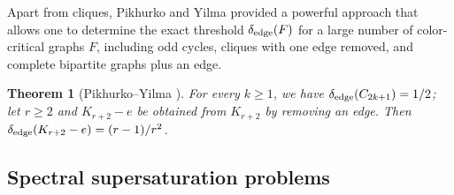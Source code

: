 \documentclass[11pt,a4paper]{article}
\newtheorem{theorem}{Theorem}[section]
\theoremstyle{definition}
\theoremstyle{plain}
\renewcommand{\ge}{\geqslant}
\begin{document}
Apart from cliques, 
Pikhurko and Yilma \cite{PY2017} 
provided a powerful approach that allows one to determine the exact threshold $\delta_{\rm edge}(F)$ for a large number of color-critical
graphs $F$, including odd cycles, cliques with one edge removed, and complete bipartite
graphs plus an edge.  


\begin{theorem}[Pikhurko--Yilma \cite{PY2017}] 
\label{thm-edge-cycle}
For every $k\ge 1$, we have 
$\delta_{\rm edge}(C_{2k+1})= 1/ 2$; 
let $r\ge 2$ and $K_{r+2}-e$ be obtained from $K_{r+2}$ by removing an edge. Then 
$\delta_{\rm edge}(K_{r+2}-e)={(r-1)}/{r^2}$. 
\end{theorem}



\subsection{Spectral supersaturation problems}
\end{document}
